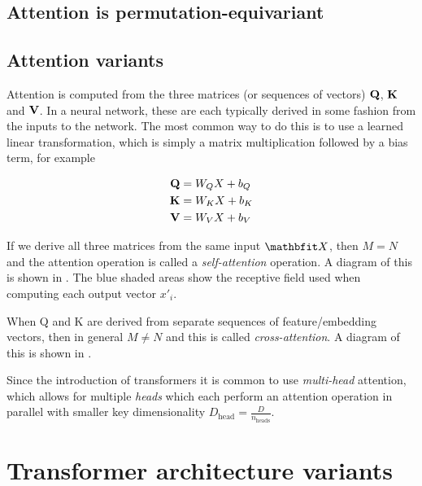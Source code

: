 \subsection{Attention is permutation-equivariant}




\subsection{Attention variants}

Attention is computed from the three matrices (or sequences of vectors) $\mathbf{Q}$, $\mathbf{K}$ and $\mathbf{V}$. In a neural network, these are each typically derived in some fashion from the inputs to the network. The most common way to do this is to use a learned linear transformation, which is simply a matrix multiplication followed by a bias term, for example

\begin{align}
\label{eqn:attn-linear}
\mathbf{Q} &= W_{Q} X + b_{Q} \\
\mathbf{K} &= W_{K} X + b_{K} \\
\mathbf{V} &= W_{V} X + b_{V}
\end{align}

If we derive all three matrices from the same input $\X$, then $M = N$ and the attention operation is called a \textit{self-attention} operation. A diagram of this is shown in . The blue shaded areas show the receptive field used when computing each output vector $x'_i$.

When Q and K are derived from separate sequences of feature/embedding vectors, then in general $M ≠ N$ and this is called \textit{cross-attention}. A diagram of this is shown in .



Since the introduction of transformers it is common to use \textit{multi-head} attention, which allows for multiple \textit{heads} which each perform an attention operation in parallel with smaller key dimensionality $D_{\text{head}} = \frac{D}{ n_{\text{heads}}}$.


\section{Transformer architecture variants}

